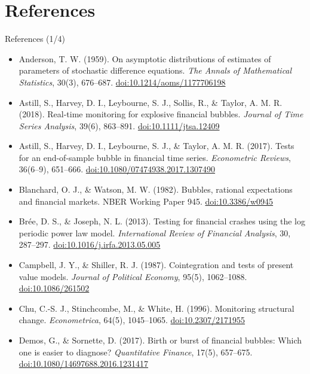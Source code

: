 \section{References}

\begin{frame}{References (1/4)}
\itemsize{\tiny}
\begin{itemize}
    \item Anderson, T. W. (1959). On asymptotic distributions of estimates of parameters of stochastic difference equations. \textit{The Annals of Mathematical Statistics}, 30(3), 676--687. \href{https://doi.org/10.1214/aoms/1177706198}{doi:10.1214/aoms/1177706198}
    \item Astill, S., Harvey, D. I., Leybourne, S. J., Sollis, R., \& Taylor, A. M. R. (2018). Real-time monitoring for explosive financial bubbles. \textit{Journal of Time Series Analysis}, 39(6), 863--891. \href{https://doi.org/10.1111/jtsa.12409}{doi:10.1111/jtsa.12409}
    \item Astill, S., Harvey, D. I., Leybourne, S. J., \& Taylor, A. M. R. (2017). Tests for an end-of-sample bubble in financial time series. \textit{Econometric Reviews}, 36(6--9), 651--666. \href{https://doi.org/10.1080/07474938.2017.1307490}{doi:10.1080/07474938.2017.1307490}
    \item Blanchard, O. J., \& Watson, M. W. (1982). Bubbles, rational expectations and financial markets. NBER Working Paper 945. \href{https://doi.org/10.3386/w0945}{doi:10.3386/w0945}
    \item Brée, D. S., \& Joseph, N. L. (2013). Testing for financial crashes using the log periodic power law model. \textit{International Review of Financial Analysis}, 30, 287--297. \href{https://doi.org/10.1016/j.irfa.2013.05.005}{doi:10.1016/j.irfa.2013.05.005}
    \item Campbell, J. Y., \& Shiller, R. J. (1987). Cointegration and tests of present value models. \textit{Journal of Political Economy}, 95(5), 1062--1088. \href{https://doi.org/10.1086/261502}{doi:10.1086/261502}
    \item Chu, C.-S. J., Stinchcombe, M., \& White, H. (1996). Monitoring structural change. \textit{Econometrica}, 64(5), 1045--1065. \href{https://doi.org/10.2307/2171955}{doi:10.2307/2171955}
    \item Demos, G., \& Sornette, D. (2017). Birth or burst of financial bubbles: Which one is easier to diagnose? \textit{Quantitative Finance}, 17(5), 657--675. \href{https://doi.org/10.1080/14697688.2016.1231417}{doi:10.1080/14697688.2016.1231417}

\end{itemize}
\end{frame}
